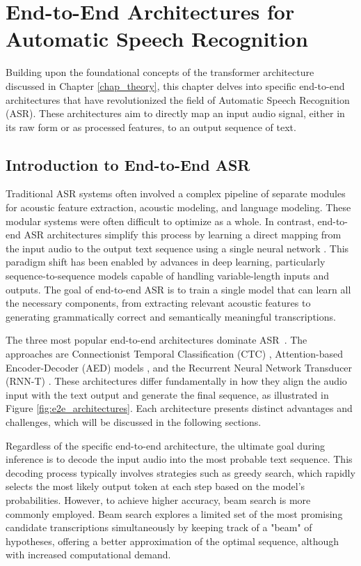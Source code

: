 \chapter{End-to-End Architectures for Automatic Speech Recognition}\label{chap_e2e_archs}

Building upon the foundational concepts of the transformer architecture discussed in Chapter \ref{chap_theory}, this chapter delves into specific end-to-end architectures that have revolutionized the field of Automatic Speech Recognition (ASR). These architectures aim to directly map an input audio signal, either in its raw form or as processed features, to an output sequence of text.

\section{Introduction to End-to-End ASR}

Traditional ASR systems often involved a complex pipeline of separate modules for acoustic feature extraction, acoustic modeling, and language modeling. These modular systems were often difficult to optimize as a whole. In contrast, end-to-end ASR architectures simplify this process by learning a direct mapping from the input audio to the output text sequence using a single neural network \cite{graves2012sequence}. This paradigm shift has been enabled by advances in deep learning, particularly sequence-to-sequence models capable of handling variable-length inputs and outputs. The goal of end-to-end ASR is to train a single model that can learn all the necessary components, from extracting relevant acoustic features to generating grammatically correct and semantically meaningful transcriptions.

The three most popular end-to-end architectures dominate ASR~\cite{Li_2022, KHEDDAR2024102422}. The approaches are Connectionist Temporal Classification (CTC) \cite{graves2006connectionist, graves2014towards}, Attention-based Encoder-Decoder (AED) models \cite{chorowski2015attentionbased, Chan_2016}, and the Recurrent Neural Network Transducer (RNN-T) \cite{graves2012sequence}. These architectures differ fundamentally in how they align the audio input with the text output and generate the final sequence, as illustrated in Figure \ref{fig:e2e_architectures}. Each architecture presents distinct advantages and challenges, which will be discussed in the following sections.

Regardless of the specific end-to-end architecture, the ultimate goal during inference is to decode the input audio into the most probable text sequence. This decoding process typically involves strategies such as greedy search, which rapidly selects the most likely output token at each step based on the model's probabilities. However, to achieve higher accuracy, beam search is more commonly employed. Beam search explores a limited set of the most promising candidate transcriptions simultaneously by keeping track of a "beam" of hypotheses, offering a better approximation of the optimal sequence, although with increased computational demand.


